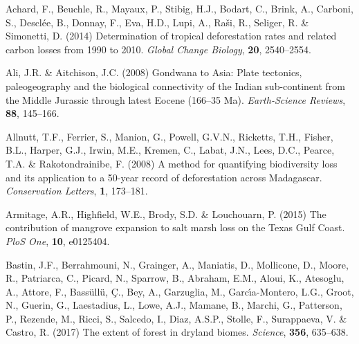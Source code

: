 \documentclass[a4paper, 12pt, leqno]{article} %
\begin{document}
\renewcommand{\bibsection}{} %
\begin{thebibliography}{55}
\providecommand{\natexlab}[1]{#1}

Achard, F., Beuchle, R., Mayaux, P., Stibig, H.J., Bodart, C., Brink, A.,
  Carboni, S., Desclée, B., Donnay, F., Eva, H.D., Lupi, A., Raši, R.,
  Seliger, R. \& Simonetti, D. (2014) Determination of tropical deforestation
  rates and related carbon losses from 1990 to 2010.
\newblock \emph{Global Change Biology}, \textbf{20}, 2540--2554.

Ali, J.R. \& Aitchison, J.C. (2008) {Gondwana to Asia: Plate tectonics,
  paleogeography and the biological connectivity of the Indian sub-continent
  from the Middle Jurassic through latest Eocene (166--35 Ma)}.
\newblock \emph{Earth-Science Reviews}, \textbf{88}, 145--166.

Allnutt, T.F., Ferrier, S., Manion, G., Powell, G.V.N., Ricketts, T.H., Fisher,
  B.L., Harper, G.J., Irwin, M.E., Kremen, C., Labat, J.N., Lees, D.C., Pearce,
  T.A. \& Rakotondrainibe, F. (2008) {A method for quantifying biodiversity
  loss and its application to a 50-year record of deforestation across
  Madagascar}.
\newblock \emph{Conservation Letters}, \textbf{1}, 173--181.

Armitage, A.R., Highfield, W.E., Brody, S.D. \& Louchouarn, P. (2015) {The
  contribution of mangrove expansion to salt marsh loss on the Texas Gulf
  Coast}.
\newblock \emph{PloS One}, \textbf{10}, e0125404.

Bastin, J.F., Berrahmouni, N., Grainger, A., Maniatis, D., Mollicone, D.,
  Moore, R., Patriarca, C., Picard, N., Sparrow, B., Abraham, E.M., Aloui, K.,
  Atesoglu, A., Attore, F., Bass{\"u}ll{\"u}, {\c C}., Bey, A., Garzuglia, M.,
  Garc{\'\i}a-Montero, L.G., Groot, N., Guerin, G., Laestadius, L., Lowe, A.J.,
  Mamane, B., Marchi, G., Patterson, P., Rezende, M., Ricci, S., Salcedo, I.,
  Diaz, A.S.P., Stolle, F., Surappaeva, V. \& Castro, R. (2017) The extent of
  forest in dryland biomes.
\newblock \emph{Science}, \textbf{356}, 635--638.


\end{thebibliography}
\end{document}
